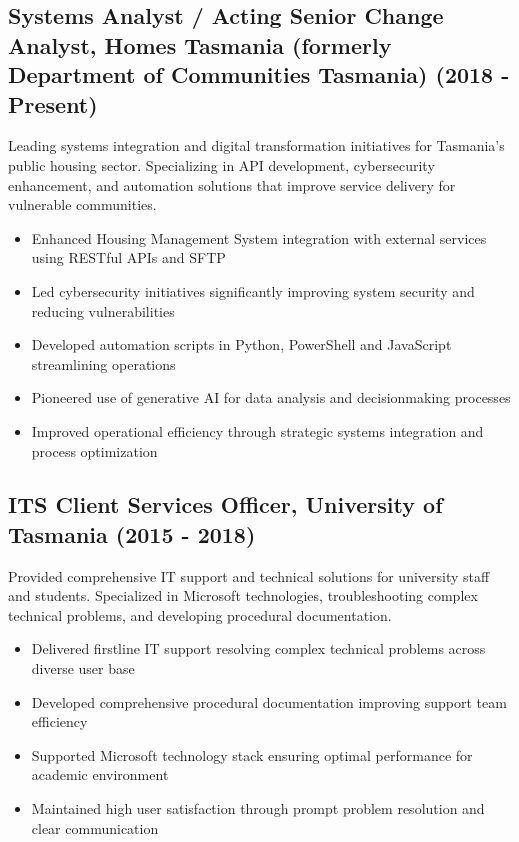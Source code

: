 \documentclass{article}
\begin{document}
\subsection*{Systems Analyst / Acting Senior Change Analyst, Homes Tasmania (formerly Department of Communities Tasmania) (2018 - Present)}
Leading systems integration and digital transformation initiatives for Tasmania's public housing sector. Specializing in API development, cybersecurity enhancement, and automation solutions that improve service delivery for vulnerable communities.
\begin{itemize}
    \item Enhanced Housing Management System integration with external services using RESTful APIs and SFTP
    \item Led cybersecurity initiatives significantly improving system security and reducing vulnerabilities
    \item Developed automation scripts in Python, PowerShell and JavaScript streamlining operations
    \item Pioneered use of generative AI for data analysis and decisionmaking processes
    \item Improved operational efficiency through strategic systems integration and process optimization
\end{itemize}

\subsection*{ITS Client Services Officer, University of Tasmania (2015 - 2018)}
Provided comprehensive IT support and technical solutions for university staff and students. Specialized in Microsoft technologies, troubleshooting complex technical problems, and developing procedural documentation.
\begin{itemize}
    \item Delivered firstline IT support resolving complex technical problems across diverse user base
    \item Developed comprehensive procedural documentation improving support team efficiency
    \item Supported Microsoft technology stack ensuring optimal performance for academic environment
    \item Maintained high user satisfaction through prompt problem resolution and clear communication
\end{itemize}
\end{document}
